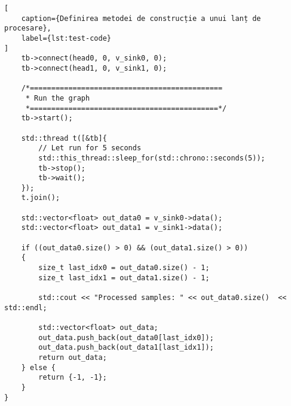 \begin{lstlisting}[
    caption={Definirea metodei de construcție a unui lanț de procesare},
    label={lst:test-code}
]
    tb->connect(head0, 0, v_sink0, 0);
    tb->connect(head1, 0, v_sink1, 0);

    /*=============================================
     * Run the graph
     *============================================*/
    tb->start();

    std::thread t([&tb]{
        // Let run for 5 seconds
        std::this_thread::sleep_for(std::chrono::seconds(5));
        tb->stop();
        tb->wait();
    });
    t.join();

    std::vector<float> out_data0 = v_sink0->data();
    std::vector<float> out_data1 = v_sink1->data();

    if ((out_data0.size() > 0) && (out_data1.size() > 0))
    {
        size_t last_idx0 = out_data0.size() - 1;
        size_t last_idx1 = out_data1.size() - 1;

        std::cout << "Processed samples: " << out_data0.size()  << std::endl;

        std::vector<float> out_data;
        out_data.push_back(out_data0[last_idx0]);
        out_data.push_back(out_data1[last_idx1]);
        return out_data;
    } else {
        return {-1, -1};
    }
}
\end{lstlisting}


